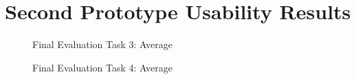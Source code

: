 \section{Second Prototype Usability Results}\label{chp:prototypeSecondResults}
\begin{figure}[!h]
  \centering
  \begin{minipage}[b]{0.47\textwidth}
    \caption{Final Evaluation Task 3: Average}
  \end{minipage}
  \hfill
  \begin{minipage}[b]{0.47\textwidth}
  \caption{Final Evaluation Task 4: Average}
  \end{minipage}
\end{figure}\vspace{2em}
